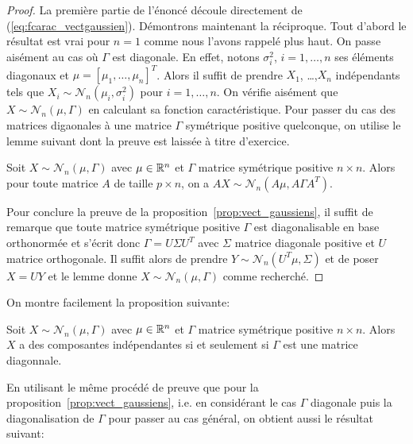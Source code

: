  \begin{proof}
   La premi\`ere partie de l'\'enonc\'e d\'ecoule directement de
   (\ref{eq:fcarac_vectgaussien}).  D\'emontrons maintenant la r\'eciproque. Tout
   d'abord le r\'esultat est vrai pour $n=1$ comme nous l'avons rappel\'e plus haut. On
   passe ais\'ement au cas o\`u $\Gamma$ est diagonale. En effet, notons
   $\sigma_i^2$, $i=1,\dots,n$ ses \'el\'ements diagonaux et
   $\mu=[\mu_1,\dots,\mu_n]^T$. Alors il suffit de prendre $X_1$, \dots ,$X_n$
   ind\'ependants tels que $X_i\sim\mathcal{N}_n( \mu_i, \sigma_i^2)$ pour
   $i=1,\dots,n$. On v\'erifie ais\'ement que $X\sim\mathcal{N}_n( \mu, \Gamma)$ en
   calculant sa fonction caract\'eristique. Pour passer du cas des matrices
   digaonales \`a une matrice $\Gamma$ sym\'etrique
   positive quelconque, on utilise le lemme suivant dont la preuve est laiss\'ee
   \`a titre d'exercice.
   \begin{lemma}
     Soit $X\sim\mathcal{N}_n( \mu, \Gamma)$ avec $\mu\in\mathbb{R}^n$ et
      $\Gamma$ matrice sym\'etrique positive $n\times n$. Alors pour toute
      matrice $A$ de taille $p\times n$, on a  $AX\sim\mathcal{N}_n( A\mu,
      A\Gamma A^T)$.
   \end{lemma}
   Pour conclure la preuve de la proposition~\ref{prop:vect_gaussiens}, il
   suffit de remarque que toute matrice sym\'etrique
   positive $\Gamma$ est diagonalisable en base orthonorm\'ee et s'\'ecrit donc
   $\Gamma=U\Sigma U^T$ avec $\Sigma$ matrice diagonale positive et $U$ matrice
   orthogonale. Il suffit alors de prendre $Y\sim\mathcal{N}_n( U^T\mu, \Sigma)$
   et de poser $X=UY$ et le lemme donne $X\sim\mathcal{N}_n( \mu, \Gamma)$
   comme recherch\'e.
\end{proof}

On montre facilement la proposition suivante:

\begin{proposition}\label{prop:vect_gaussiens_indep}
   Soit $X\sim\mathcal{N}_n( \mu, \Gamma)$ avec $\mu\in\mathbb{R}^n$ et $\Gamma$
   matrice sym\'etrique positive $n\times n$. Alors $X$ a des composantes
   ind\'ependantes si et seulement si $\Gamma$ est une matrice diagonnale.
 \end{proposition}


En utilisant le m\^{e}me proc\'ed\'e de preuve que pour la
proposition~\ref{prop:vect_gaussiens}, i.e. en consid\'erant le cas $\Gamma$
diagonale puis la diagonalisation de $\Gamma$ pour passer au cas g\'en\'eral, on
obtient aussi le r\'esultat suivant:

